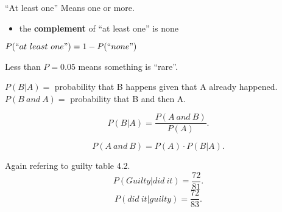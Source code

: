 
``At least one'' Means one or more.
\begin{itemize}
    \item the \textbf{complement} of ``at least one'' is none
\end{itemize}
$P(``at \ least \ one") = 1-P(``none")$


Less than $P=0.05$ means something is ``rare''.

$P(B|A)=$ probability that B happens given that A already happened.
$P(B \ and \ A)=$ probability that B and then A.

\[ P(B|A)=\frac{P(A \ and \ B)}{P(A)} .\] 

\[ P(A \ and \ B) = P(A) \cdot P(B|A) .\] 


Again refering to guilty table 4.2.
\[ P(Guilty|did\ it)= \frac{72}{81} .\] 
\[ P(did\ it|guilty) = \frac{72}{83} .\] 



